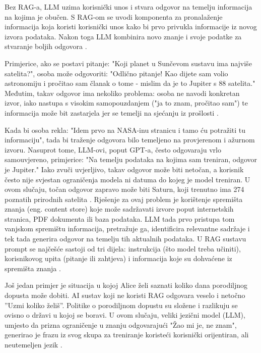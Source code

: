 \documentclass[]{foi}
\begin{document}
Bez RAG-a, LLM uzima korisnički unos i stvara odgovor na temelju informacija na kojima je obučen. S RAG-om se uvodi komponenta za pronalaženje 
informacija koja koristi korisnički unos kako bi prvo privukla informacije iz novog izvora podataka. Nakon toga LLM kombinira novo znanje i svoje 
podatke za stvaranje boljih odgovora \cite{awsRAG2025}.

Primjerice, ako se postavi pitanje: "Koji planet u Sunčevom sustavu ima najviše satelita?", osoba može odgovoriti: "Odlično pitanje! Kao dijete sam volio astronomiju i pročitao sam članak o tome
- mislim da je to Jupiter s 88 satelita." Međutim, takav odgovor ima nekoliko problema: osoba ne navodi konkretan izvor, iako nastupa s visokim samopouzdanjem ("ja to znam, pročitao sam")
te informacija može bit zastarjela jer se temelji na sjećanju iz prošlosti \cite{ibm2023rag}.

Kada bi osoba rekla: "Idem prvo na NASA-inu stranicu i tamo ću potražiti tu informaciju", tada bi traženje odgovora bilo temeljeno na provjerenom i ažurnom izvoru.
Nasuprot tome, LLM-ovi, poput GPT-a, često odgovaraju vrlo samouvjereno, primjerice: "Na temelju podataka na kojima sam treniran, odgovor je Jupiter."
Iako zvuči uvjerljivo, takav odgovor može biti netočan, a korisnik često nije svjestan ograničenja modela ni datuma do kojeg je model treniran. U ovom slučaju, točan odgovor 
zapravo može biti Saturn, koji trenutno ima 274 poznatih prirodnih satelita \cite{worldatlas2025moons}. Rješenje za ovaj problem je korištenje spremišta znanja (eng. content store) koje može sadržavati izvore poput
internetskih stranica, PDF dokumenta ili baza podataka. LLM tada prvo pristupa tom vanjskom spremištu informacija, pretražuje ga, identificira relevantne sadržaje i tek tada generira
odgovor na temelju tih aktualnih podataka. U RAG sustavu prompt se najčešće sastoji od tri dijela: instrukcija (što model treba učiniti), korisnikovog upita (pitanje ili zahtjeva) i informacija 
koje su dohvaćene iz spremišta znanja \cite{ibm2023rag}.

Još jedan primjer je situacija u kojoj Alice želi saznati koliko dana porodiljnog dopusta može dobiti. AI sustav koji ne koristi RAG odgovara veselo i netočno ”Uzmi koliko želiš”.
Politike o porodiljnom dopustu su složene i razlikuju se ovisno o državi u kojoj se boravi. U ovom slučaju, veliki jezični model (LLM), umjesto da prizna ograničenje u znanju odgovarajući
"Žao mi je, ne znam", generirao je frazu iz svog skupa za treniranje koristeći korisnički orijentiran, ali neutemeljen jezik \cite{ibmRAG}.
\end{document}
